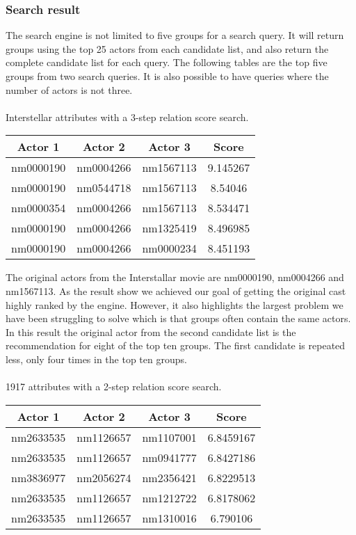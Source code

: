 \subsubsection{Search result}
The search engine is not limited to five groups for a search query. It will return groups using the top 25 actors from each candidate list, and also return the complete candidate list for each query. The following tables are the top five groups from two search queries. It is also possible to have queries where the number of actors is not three.
\\\\
Interstellar attributes with a 3-step relation score search.
\begin{center}
    \begin{tabular}{ |c|c|c|c| } 
        \hline
        Actor 1 & Actor 2 & Actor 3 & Score \\ 
        \hline
        nm0000190 & nm0004266 & nm1567113  & 9.145267 \\ 
        nm0000190 & nm0544718 & nm1567113  & 8.54046 \\ 
        nm0000354 & nm0004266 & nm1567113  & 8.534471 \\ 
        nm0000190 & nm0004266 & nm1325419  & 8.496985 \\ 
        nm0000190 & nm0004266 & nm0000234  & 8.451193 \\ 
        \hline
    \end{tabular}
\end{center}

The original actors from the Interstallar movie are nm0000190, nm0004266 and nm1567113. As the result show we achieved our goal of getting the original cast highly ranked by the engine. However, it also highlights the largest problem we have been struggling to solve which is that groups often contain the same actors. In this result the original actor from the second candidate list is the recommendation for eight of the top ten groups. The first candidate is repeated less, only four times in the top ten groups.
\\\\
1917 attributes with a 2-step relation score search.
\begin{center}
    \begin{tabular}{ |c|c|c|c| } 
        \hline
        Actor 1 & Actor 2 & Actor 3 & Score \\ 
        \hline
        nm2633535 & nm1126657 & nm1107001  & 6.8459167 \\ 
        nm2633535 & nm1126657 & nm0941777  & 6.8427186 \\ 
        nm3836977 & nm2056274 & nm2356421 & 6.8229513 \\ 
        nm2633535 & nm1126657 & nm1212722  & 6.8178062 \\ 
        nm2633535 & nm1126657 & nm1310016  & 6.790106 \\ 
        \hline
    \end{tabular}
\end{center}

